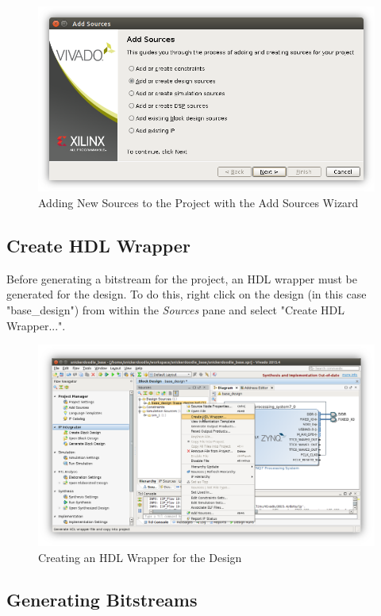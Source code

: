 \begin{figure}
	\centering
	\includegraphics{images/Add_Sources_Dialog.png}
	\caption{Adding New Sources to the Project with the Add Sources Wizard}
	\label{fig:addsourceswiz}
\end{figure}


\subsection{Create HDL Wrapper}

Before generating a bitstream for the project, an HDL wrapper must be generated for the design. To do this, right click on the design (in this case "base\_design") from within the \textit{Sources} pane and select "Create HDL Wrapper...". 


\begin{figure}
	\centering
	\includegraphics{images/Create_HDL_Wrapper.png}
	\caption{Creating an HDL Wrapper for the Design}
	\label{fig:createhdlwrapper}
\end{figure}


\subsection{Generating Bitstreams}

